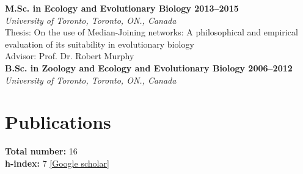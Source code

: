 \documentclass[11pt,letterpaper,sans]{moderncv} %
\begin{document}
\textbf{M.Sc. in Ecology and Evolutionary Biology \hfill 2013--2015}\\
\textit{University of Toronto, Toronto, ON., Canada}\\
Thesis: On the use of Median-Joining networks: A philosophical and empirical evaluation of its suitability in evolutionary biology\\
Advisor: Prof. Dr. Robert Murphy\\

\textbf{B.Sc. in Zoology and Ecology and Evolutionary Biology \hfill 2006--2012}\\
\textit{University of Toronto, Toronto, ON., Canada}
\pagebreak

\section{Publications}
\textbf{Total number:} 16\\
\textbf{h-index:} 7 \href{https://scholar.google.com/citations?user=UQFcoZoAAAAJ&hl=en}{[Google scholar]}\\
\end{document}
